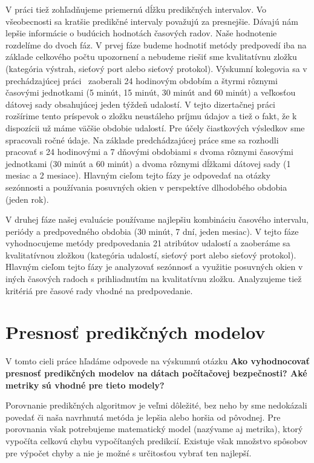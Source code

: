 \documentclass[thesismargins, thesislinespacing, openright, upjsfrontpage, combineabstracts]{rnthesis}
\begin{document}
V práci tiež zohľadňujeme priemernú dĺžku predikčných intervalov. Vo všeobecnosti sa kratšie predikčné intervaly považujú za presnejšie. Dávajú nám lepšie informácie o budúcich hodnotách časových radov. Naše hodnotenie rozdelíme do dvoch fáz. V prvej fáze budeme hodnotiť metódy predpovedí iba na základe celkového počtu upozornení a nebudeme riešiť sme kvalitatívnu zložku (kategória výstrah, sieťový port alebo sieťový protokol). Výskumní kolegovia sa v prechádzajúcej práci~\cite{new_paper} zaoberali 24 hodinovým obdobím a štyrmi rôznymi časovými jednotkami (5 minút, 15 minút, 30 minút and 60 minút) a veľkosťou dátovej sady obsahujúcej jeden týždeň udalostí. V tejto dizertačnej práci rozšírime tento príspevok o zložku neustáleho príjmu údajov a tiež o fakt, že k dispozícii už máme väčšie obdobie udalostí. Pre účely čiastkových výsledkov sme spracovali ročné údaje. Na základe predchádzajúcej práce sme sa rozhodli pracovať s 24 hodinovými a 7 dňovými obdobiami s dvoma rôznymi časovými jednotkami (30 minút a 60 minút) a dvoma rôznymi dĺžkami dátovej sady (1 mesiac a 2 mesiace). Hlavným cieľom tejto fázy je odpovedať na otázky sezónnosti a používania posuvných okien v perspektíve dlhodobého obdobia (jeden rok).

V druhej fáze našej evaluácie používame najlepšiu kombináciu časového intervalu, periódy a predpovedného obdobia (30 minút, 7 dní, jeden mesiac). V tejto fáze vyhodnocujeme metódy predpovedania 21 atribútov udalostí a zaoberáme sa kvalitatívnou zložkou (kategória udalostí, sieťový port alebo sieťový protokol). Hlavným cieľom tejto fázy je analyzovať sezónnosť a využitie posuvných okien v iných časových radoch s prihliadnutím na kvalitatívnu zložku. Analyzujeme tiež kritériá pre časové rady vhodné na predpovedanie.

\section{Presnosť predikčných modelov}
V tomto cieli práce hľadáme odpovede na výskumnú otázku \textbf{Ako vyhodnocovať presnosť predikčných modelov na dátach počítačovej bezpečnosti? Aké metriky sú vhodné pre tieto modely?}

Porovnanie predikčných algoritmov je veľmi dôležité, bez neho by sme nedokázali povedať či naša navrhnutá metóda je lepšia alebo horšia od pôvodnej. Pre porovnania však potrebujeme matematický model (nazývame aj metrika), ktorý vypočíta celkovú chybu vypočítaných predikcií. Existuje však množstvo spôsobov pre výpočet chyby a nie je možné s určitosťou vybrať ten najlepší. 
\end{document}
